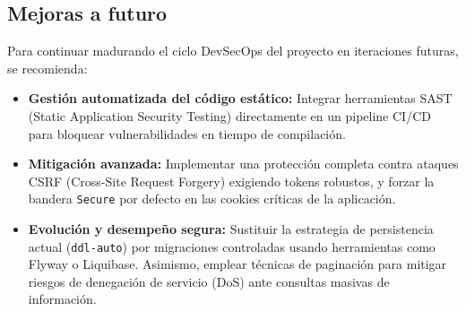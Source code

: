 \documentclass[11pt,oneside]{article}
\begin{document}
\subsection{Mejoras a futuro}
Para continuar madurando el ciclo DevSecOps del proyecto en iteraciones futuras, se recomienda:
\begin{itemize}
    \item \textbf{Gestión automatizada del código estático:} Integrar herramientas SAST (Static Application Security Testing) directamente en un pipeline CI/CD para bloquear vulnerabilidades en tiempo de compilación.
    \item \textbf{Mitigación avanzada:} Implementar una protección completa contra ataques CSRF (Cross-Site Request Forgery) exigiendo tokens robustos, y forzar la bandera \texttt{Secure} por defecto en las cookies críticas de la aplicación.
    \item \textbf{Evolución y desempeño segura:} Sustituir la estrategia de persistencia actual (\texttt{ddl-auto}) por migraciones controladas usando herramientas como Flyway o Liquibase. Asimismo, emplear técnicas de paginación para mitigar riesgos de denegación de servicio (DoS) ante consultas masivas de información.
\end{itemize}
\end{document}
